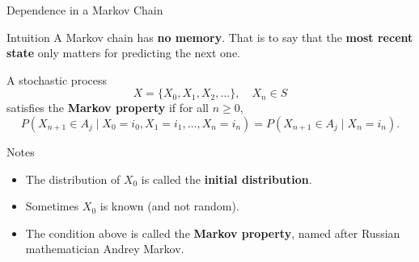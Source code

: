 \documentclass[8pt]{beamer}
\begin{document}
\begin{frame}{Dependence in a Markov Chain}
\begin{block}{Intuition} 
\vspace{1mm}
A Markov chain has \textbf{no memory}. That is to say that the \textbf{most recent state} only matters for predicting the next one.
\end{block}

\vspace{2mm}

\begin{definition}
\vspace{1mm}
A stochastic process 
\begin{equation*}
X = \{X_0, X_1, X_2, \ldots\}, \quad X_n \in S
\end{equation*}
satisfies the \textbf{Markov property} if for all $n \geq 0$,
\begin{equation*}
P(X_{n+1} \in A_j \mid X_0=i_0, X_1=i_1, \ldots, X_n=i_n) 
= P(X_{n+1} \in A_j \mid X_n = i_n).
\end{equation*}
\end{definition}

\vspace{2mm}

\begin{exampleblock}{Notes}
\begin{itemize}
  \item The distribution of $X_0$ is called the \textbf{initial distribution}.  
  \item Sometimes $X_0$ is known (and not random).  
  \item The condition above is called the \textbf{Markov property}, 
        named after Russian mathematician Andrey Markov.
\end{itemize}
\end{exampleblock}
\end{frame}
\end{document}
